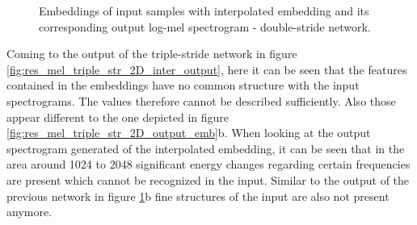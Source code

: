 \begin{figure}[htb!]
    \centering
    \captionsetup{justification=centering}
    \caption{Embeddings of input samples with interpolated embedding and its corresponding output log-mel spectrogram - double-stride network.}
    \label{fig:res_mel_double_str_2D_inter_output}
\end{figure}

Coming to the output of the triple-stride network in figure \ref{fig:res_mel_triple_str_2D_inter_output}, here it can be seen that the features contained in the embeddings have no common structure with the input spectrograms. The values therefore cannot be described sufficiently. Also those appear different to the one depicted in figure \ref{fig:res_mel_triple_str_2D_output_emb}b. When looking at the output spectrogram generated of the interpolated embedding, it can be seen that in the area around 1024 to 2048 significant energy changes regarding certain frequencies are present which cannot be recognized in the input. Similar to the output of the previous network in figure \ref{fig:res_mel_double_str_2D_inter_output}b fine structures of the input are also not present anymore. 

